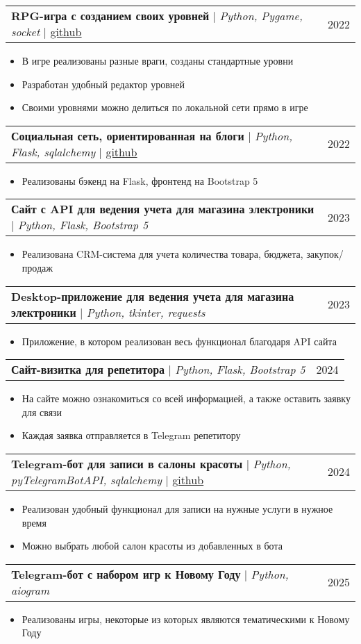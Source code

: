 \documentclass[letterpaper,11pt]{article}
\makeatletter
\newcommand{\resumeItem}[1]{
  \item\small{
    {#1 \vspace{-2pt}}
  }
}
\newcommand{\resumeProjectHeading}[2]{
    \item
    \begin{tabular*}{0.97\textwidth}{l@{\extracolsep{\fill}}r}
      \small#1 & #2 \\
    \end{tabular*}\vspace{-7pt}
}
\newcommand{\resumeItemListStart}{\begin{itemize}}
\newcommand{\resumeItemListEnd}{\end{itemize}\vspace{-5pt}}
\makeatother
\begin{document}
      \resumeProjectHeading
          {\textbf{RPG-игра с созданием своих уровней} $|$ \emph{Python, Pygame, socket} | \href{https://github.com/IntroSpace/RPG-Diamond}{\underline{github}}}{2022}
          \resumeItemListStart
            \resumeItem{В игре реализованы разные враги, созданы стандартные уровни}
            \resumeItem{Разработан удобный редактор уровней}
            \resumeItem{Своими уровнями можно делиться по локальной сети прямо в игре}
          \resumeItemListEnd
          
      \resumeProjectHeading
          {\textbf{Социальная сеть, ориентированная на блоги} $|$ \emph{Python, Flask, sqlalchemy} | \href{https://github.com/IntroSpace/blogger_and_chatter}{\underline{github}}}{2022}
          \resumeItemListStart
            \resumeItem{Реализованы бэкенд на Flask, фронтенд на Bootstrap 5}
          \resumeItemListEnd
      \resumeProjectHeading
          {\textbf{Сайт с API для ведения учета для магазина электроники} $|$ \emph{Python, Flask, Bootstrap 5}}{2023}
          \resumeItemListStart
            \resumeItem{Реализована CRM-система для учета количества товара, бюджета, закупок/продаж}
          \resumeItemListEnd
        \resumeProjectHeading
          {\textbf{Desktop-приложение для ведения учета для магазина электроники} $|$ \emph{Python, tkinter, requests}}{2023}
          \resumeItemListStart
            \resumeItem{Приложение, в котором реализован весь функционал благодаря API сайта}
          \resumeItemListEnd
        \resumeProjectHeading
          {\textbf{Сайт-визитка для репетитора} $|$ \emph{Python, Flask, Bootstrap 5}}{2024}
          \resumeItemListStart
            \resumeItem{На сайте можно ознакомиться со всей информацией, а также 
            оставить заявку для связи}
            \resumeItem{Каждая заявка отправляется в Telegram репетитору}
          \resumeItemListEnd
        \resumeProjectHeading
          {\textbf{Telegram-бот для записи в салоны красоты} $|$ \emph{Python, pyTelegramBotAPI, sqlalchemy} | \href{https://github.com/uoyyy/salon_krasotok}{\underline{github}}}{2024}
          \resumeItemListStart
            \resumeItem{Реализован удобный функционал для записи на нужные услуги в нужное время}
            \resumeItem{Можно выбрать любой салон красоты из добавленных в бота}
          \resumeItemListEnd
        \resumeProjectHeading
          {\textbf{Telegram-бот с набором игр к Новому Году} $|$ \emph{Python, aiogram}}{2025}
          \resumeItemListStart
            \resumeItem{Реализованы игры, некоторые из которых являются тематическими к Новому Году}
          \resumeItemListEnd
\end{document}
